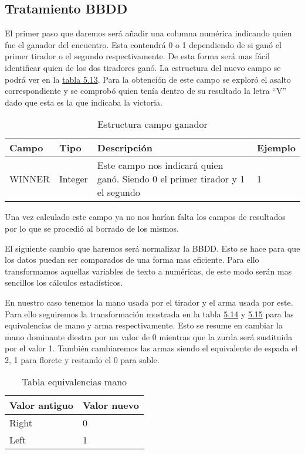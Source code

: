 \subsection{Tratamiento \acs{BBDD}}

El primer paso que daremos será añadir una columna numérica indicando quien
fue el ganador del encuentro. Esta contendrá 0 o 1 dependiendo de si ganó
el primer tirador o el segundo respectivamente. De esta forma será mas fácil
identificar quien de los dos tiradores ganó. La estructura del nuevo campo
se podrá ver en la \hyperref[tab:Estructura campo ganador]{tabla 5.13}. Para la obtención de este campo se exploró
el asalto correspondiente y se comprobó quien tenía dentro de su resultado
la letra \enquote{V} dado que esta es la que indicaba la victoria.

\begin{longtable}{|p{3cm}p{2cm}p{6cm}p{3cm}|}
  \caption{Estructura campo ganador}
  \label{tab:Estructura campo ganador}
  \endfirsthead
  \endhead

  \hline
  \rowcolor[HTML]{C0C0C0}
  Campo & Tipo & Descripción & Ejemplo \\ \hline
  WINNER & Integer & Este campo nos indicará quien ganó. Siendo 0 el primer tirador y 1 el segundo & 1 \\ \hline
\end{longtable}

Una vez calculado este campo ya no nos harían falta los campos de resultados
por lo que se procedió al borrado de los mismos.

El siguiente cambio que haremos será normalizar la \acs{BBDD}. Esto se hace para
que los datos puedan ser comparados de una forma mas eficiente. Para ello
transformamos aquellas variables de texto a numéricas, de este modo serán
mas sencillos los cálculos estadísticos.

En nuestro caso tenemos la mano usada por el tirador y el arma usada por este.
Para ello seguiremos la transformación mostrada en la tabla \hyperref[tab:Tabla equivalencias mano]{5.14} y \hyperref[tab:Tabla equivalencias arma]{5.15} para
las equivalencias de mano y arma respectivamente. Esto se resume en
cambiar la mano dominante diestra por un valor de 0 mientras que la zurda será
sustituida por el valor 1. También cambiaremos las armas siendo el equivalente
de espada el 2, 1 para florete y restando el 0 para sable.

\begin{table}[]
  \centering
  \caption{Tabla equivalencias mano}
  \label{tab:Tabla equivalencias mano}
  \begin{tabular}{|ll|}
    \hline
    \rowcolor[HTML]{C0C0C0}
    Valor antiguo & Valor nuevo \\ \hline
    Right & 0 \\ \hline
    Left & 1 \\ \hline
  \end{tabular}
\end{table}

